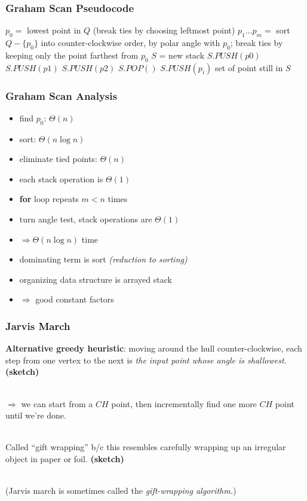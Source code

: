 \documentclass{beamer}
\newcommand{\stanza}{ \\~\ }
\begin{document}
\begin{frame} \frametitle{Graham Scan Pseudocode}
  {\small
\begin{algorithmic}[1]
   
    \State $p_0 = $ lowest point in $Q$ (break ties by choosing leftmost point)
    \State $p_1 \ldots p_m = $ sort $Q-\{p_0\}$ into counter-clockwise order,
      by polar angle with $p_0$; break ties by keeping only the point farthest from $p_0$
    \State $S$ = new stack
    \State $S.PUSH(p0)$
    \State $S.PUSH(p1)$
    \State $S.PUSH(p2)$
        \State $S.POP()$
      \EndWhile
      \State $S.PUSH(p_i)$
    \EndFor
    \State \Return set of point still in $S$
  \EndFunction
\end{algorithmic}
}
\end{frame}

\begin{frame} \frametitle{Graham Scan Analysis}
\begin{itemize}
  \item find $p_0$: $\Theta(n)$
  \item sort: $\Theta(n \log n)$
  \item eliminate tied points: $\Theta(n)$
  \item each stack operation is $\Theta(1)$
  \item \textbf{for} loop repeats $m < n$ times
  \item turn angle test, stack operations are $\Theta(1)$
  \item $\Rightarrow \Theta(n \log n)$ time
  \item dominating term is sort \emph{(reduction to sorting)}
  \item organizing data structure is arrayed stack
  \item $\Rightarrow$ good constant factors
\end{itemize}
\end{frame}

\begin{frame} \frametitle{Jarvis March}
\textbf{Alternative greedy heuristic}: moving around the hull counter-clockwise,
 each step from one vertex to the next is
 \emph{the input point whose angle is shallowest.}  \textbf{(sketch)} \stanza

 $\Rightarrow$ we can start from a $CH$ point, then incrementally find one more $CH$
 point until we're done. \stanza

 Called ``gift wrapping'' b/c this resembles carefully wrapping up an irregular
 object in paper or foil. \textbf{(sketch)} \stanza

 (Jarvis march is sometimes called the \emph{gift-wrapping algorithm.})
\end{frame}
\end{document}
